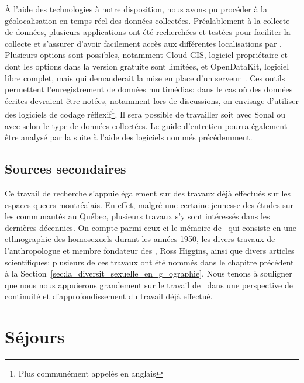 À l'aide des technologies à notre disposition, nous avons pu procéder à la géolocalisation en temps réel des données collectées.
Préalablement à la collecte de données, plusieurs applications ont été recherchées et testées pour faciliter la collecte et s'assurer d'avoir facilement accès aux différentes localisations par \gps.
Plusieurs options sont possibles, notamment Cloud GIS, logiciel propriétaire et dont les options dans la version gratuite sont limitées, et OpenDataKit, logiciel libre complet, mais qui demanderait la mise en place d'un serveur~\citep{OpenDataKit2014}.
Ces outils permettent l'enregistrement de données multimédias: dans le cas où des données écrites devraient être notées, notamment lors de discussions, on envisage d'utiliser des logiciels de codage réflexif\footnote{Plus communément appelés en anglais \cadqas}.
Il sera possible de travailler soit avec Sonal ou avec \rqda{} selon le type de données collectées.
Le guide d'entretien pourra également être analysé par la suite à l'aide des logiciels nommés précédemment.

\subsection{Sources secondaires}
\label{sub:sources_secondaires}

Ce travail de recherche s'appuie également sur des travaux déjà effectués sur les espaces queers montréalais.
En effet, malgré une certaine jeunesse des études sur les communautés \lgbt{} au Québec, plusieurs travaux s'y sont intéressés dans les dernières décennies.
On compte parmi ceux-ci le mémoire de~\cite{Leznoff1954} qui consiste en une ethnographie des homosexuels durant les années 1950, les divers travaux de l'anthropologue et membre fondateur des \agq{}, Ross Higgins, ainsi que divers articles scientifiques; plusieurs de ces travaux ont été nommés dans le chapitre précédent à la Section~\ref{sec:la_diversit_sexuelle_en_g_ographie}.
Nous tenons à souligner que nous nous appuierons grandement sur le travail de~\citep{Giraud2014} dans une perspective de continuité et d'approfondissement du travail déjà effectué.

\section{Séjours}
\label{sec:s_jours}


